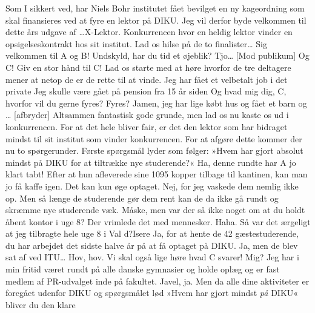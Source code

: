 \documentclass[a4paper,11pt]{article}
\begin{document}
\begin{sketch}

 Som I sikkert ved, har Niels Bohr institutet fået bevilget en ny
  kageordning som skal finansieres ved at fyre en lektor på DIKU. Jeg
  vil derfor byde velkommen til dette års udgave af \ldots X-Lektor.
 Konkurrencen hvor en heldig lektor vinder en opsigelseskontrakt hos
  sit institut. Lad os hilse på de to finalister\ldots
{}
 Sig velkommen til A og B!
 Undskyld, har du tid et øjeblik?
 Tjo\ldots
{}[Mod publikum] Og C! Giv en stor hånd til C!
 Lad os starte med at høre hvorfor de tre deltagere mener at netop de
  er de rette til at vinde.
 Jeg har fået et velbetalt job i det private
 Jeg skulle være gået på pension fra 15 år siden
 Og hvad mig dig, C, hvorfor vil du gerne fyres?
 Fyres? Jamen, jeg har lige købt hus og fået et barn og \ldots
{}[afbryder] Altsammen fantastisk gode grunde, men lad os nu kaste os ud
  i konkurrencen. For at det hele bliver fair, er det den lektor som har
  bidraget mindst til sit institut som vinder konkurrencen. For at afgøre dette
  kommer der nu to spørgerunder. Første spørgsmål lyder som følger:
  »Hvem har gjort absolut mindst på DIKU for at tiltrække nye studerende?«
 Ha, denne rundte har A jo klart tabt! Efter at hun afleverede sine 1095
  kopper tilbage til kantinen, kan man jo få kaffe igen. Det kan kun øge
  optaget.
 Nej, for jeg vaskede dem nemlig ikke op.
 Men så længe de studerende gør dem rent kan de da ikke gå rundt og
  skræmme nye studerende væk.
 Måske, men var der så ikke noget om at du holdt åbent kontor i uge 8?
  Der vrimlede det med mennesker.
 Haha. Så var det ærgeligt at jeg tilbragte hele uge 8 i Val d?Isere
 Ja, for at hente de 42 gæstestuderende, du har arbejdet det sidste
  halve år på at få optaget på DIKU.
 Ja, men de blev sat af ved ITU\ldots
{} Hov, hov. Vi skal også lige høre hvad C svarer!
 Mig? Jeg har i min fritid været rundt på alle danske gymnasier og
  holde oplæg og er fast medlem af PR-udvalget inde på fakultet.
 Javel, ja. Men da alle dine aktiviteter er foregået udenfor DIKU og
  spørgsmålet lød »Hvem har gjort mindst \emph{på} DIKU« bliver du den klare

\end{sketch}
\end{document}
